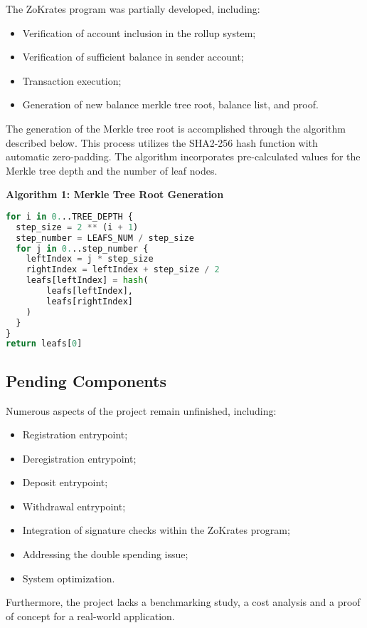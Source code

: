 The ZoKrates program was partially developed, including:
\begin{itemize}
    \item Verification of account inclusion in the rollup system;
    \item Verification of sufficient balance in sender account;
    \item Transaction execution;
    \item Generation of new balance merkle tree root, balance list, and proof.
\end{itemize}

The generation of the Merkle tree root is accomplished through the algorithm described below. This process utilizes the SHA2-256 hash function with automatic zero-padding. The algorithm incorporates pre-calculated values for the Merkle tree depth and the number of leaf nodes.

\noindent\textbf{Algorithm 1: Merkle Tree Root Generation}
\begin{lstlisting}[language=Python]
for i in 0...TREE_DEPTH {
  step_size = 2 ** (i + 1)
  step_number = LEAFS_NUM / step_size
  for j in 0...step_number {
    leftIndex = j * step_size
    rightIndex = leftIndex + step_size / 2
    leafs[leftIndex] = hash(
        leafs[leftIndex],
        leafs[rightIndex]
    )
  }
}
return leafs[0]
\end{lstlisting}

\subsection{Pending Components\label{subsec:pendingcomponents}}
Numerous aspects of the project remain unfinished, including:
\begin{itemize}
  \item Registration entrypoint;
  \item Deregistration entrypoint;
  \item Deposit entrypoint;
  \item Withdrawal entrypoint;
  \item Integration of signature checks within the ZoKrates program;
  \item Addressing the double spending issue;
  \item System optimization.
\end{itemize}
Furthermore, the project lacks a benchmarking study, a cost analysis and a proof of concept for a real-world application.


